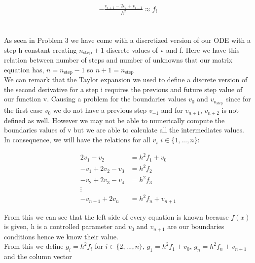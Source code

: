 \documentclass[a4paper,10pt,english]{article}
\begin{document}
			\begin{align*}
				-\frac{v_{i+1} - 2v_i + v_{i-1}}{h^2} \approx f_i
			\end{align*}
			
			
			
			\section{} %
			
			As seen in Problem 3 we have come with a discretized version of our ODE with a
			step h constant creating $n_{\text{step}} + 1$ discrete values of v and f. 
			Here we have this relation between number of steps and number of unknowns that our matrix
			equation has, $n = n_{\text{step}} - 1$ so $n + 1 = n_{\text{step}}$\\
			
			We can remark that the Taylor expansion we used to define a discrete version of
			the second derivative for a step i requires the previous and future step value
			of our function v. Causing a problem for the boundaries values $v_0$ and 
			$v_{n_{\text{step}}}$ since for the first case $v_0$ we do not have a previous step $v_{-1}$
			and for $v_{n + 1}$, $v_{n + 2}$ is not defined as well. However we
			may not be able to numerically compute the boundaries values of v but we are able to
			calculate all the intermediates values. \\
			
			In consequence, we will have the relations for all $v_i$ $i \in \{1, ..., n\}$:
			
			\begin{align*}
				2v_1 - v_2 &= h^2f_1 + v_0 \\
				-v_1 + 2v_2 - v_3 &= h^2f_2 \\
				-v_2 + 2v_3 - v_4 &= h^2f_3 \\
				\vdots \\
				-v_{n-1} + 2v_{n} &= h^2f_{n} + v_{n + 1}   
			\end{align*}
			
			From this we can see that the left side of every equation is known because
			$f(x)$ is given, h is a controlled parameter and $v_0$ and $v_{n + 1}$ are our
			boundaries conditions hence we know their value. \\
			From this we define $g_i = h^2f_i$ for $i \in \{ 2, ... , n\}$, $g_1 = h^2f_1 + v_0$, $g_{n} = h^2 f_{n} + v_{n + 1}$ and the column vector 
			
\end{document}
